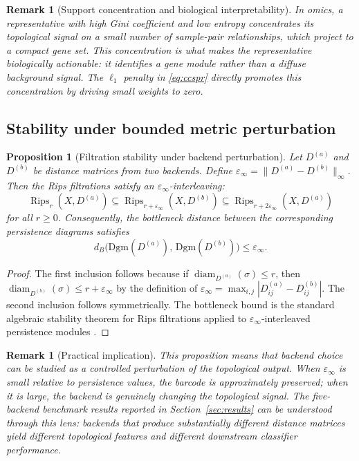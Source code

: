 \documentclass[11pt]{article}
\newtheorem{proposition}[theorem]{Proposition}
\newtheorem{remark}[theorem]{Remark}
\DeclareMathOperator{\Rips}{Rips}
\DeclareMathOperator{\diam}{diam}
\begin{document}
\begin{remark}[Support concentration and biological interpretability]\label{rem:concentration}
In omics, a representative with high Gini coefficient and low entropy concentrates its topological signal on a small number of sample-pair relationships, which project to a compact gene set.
This concentration is what makes the representative biologically actionable: it identifies a gene module rather than a diffuse background signal.
The $\ell_1$ penalty in \eqref{eq:ccspr} directly promotes this concentration by driving small weights to zero.
\end{remark}

\subsection{Stability under bounded metric perturbation}

\begin{proposition}[Filtration stability under backend perturbation]\label{prop:stability}
Let $D^{(a)}$ and $D^{(b)}$ be distance matrices from two backends.
Define $\varepsilon_\infty = \|D^{(a)} - D^{(b)}\|_\infty$.
Then the Rips filtrations satisfy an $\varepsilon_\infty$-interleaving:
\[
\Rips_r(X, D^{(a)}) \subseteq \Rips_{r + \varepsilon_\infty}(X, D^{(b)}) \subseteq \Rips_{r + 2\varepsilon_\infty}(X, D^{(a)})
\]
for all $r \ge 0$.
Consequently, the bottleneck distance between the corresponding persistence diagrams satisfies
\[
d_B\bigl(\mathrm{Dgm}(D^{(a)}),\, \mathrm{Dgm}(D^{(b)})\bigr) \le \varepsilon_\infty.
\]
\end{proposition}

\begin{proof}
The first inclusion follows because if $\diam_{D^{(a)}}(\sigma) \le r$, then $\diam_{D^{(b)}}(\sigma) \le r + \varepsilon_\infty$ by the definition of $\varepsilon_\infty = \max_{i,j} |D^{(a)}_{ij} - D^{(b)}_{ij}|$.
The second inclusion follows symmetrically.
The bottleneck bound is the standard algebraic stability theorem for Rips filtrations applied to $\varepsilon_\infty$-interleaved persistence modules \cite{chazal2014persistence}.
\end{proof}

\begin{remark}[Practical implication]\label{rem:perturbation}
This proposition means that backend choice can be studied as a \emph{controlled perturbation} of the topological output.
When $\varepsilon_\infty$ is small relative to persistence values, the barcode is approximately preserved; when it is large, the backend is genuinely changing the topological signal.
The five-backend benchmark results reported in Section~\ref{sec:results} can be understood through this lens: backends that produce substantially different distance matrices yield different topological features and different downstream classifier performance.
\end{remark}
\end{document}

